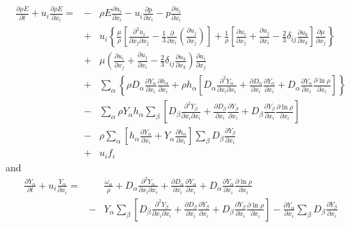 \documentclass[notitlepage]{revtex4-1}
\begin{document}
\begin{eqnarray}
\frac{\partial\rho{E}}{\partial{t}}+u_{i}\frac{\partial\rho{E}}{\partial{x}_{i}}=&-&\rho{E}\frac{\partial{u}_{i}}{\partial{x}_{i}}-u_{i}\frac{\partial{p}}{\partial{x}_{i}}-p\frac{\partial{u}_{i}}{\partial{x}_{i}}\\
&+&u_{i}\left\{\frac{\mu}{\rho}\left[\frac{\partial^{2}u_{i}}{\partial{x}_{j}\partial{x}_{j}}-\frac{1}{3}\frac{\partial}{\partial{x}_{i}}\left(\frac{\partial{u}_{j}}{\partial{x}_{j}}\right)\right]+\frac{1}{\rho}\left[\frac{\partial{u}_{i}}{\partial{x}_{j}}+\frac{\partial{u}_{j}}{\partial{x}_{i}}-\frac{2}{3}\delta_{ij}\frac{\partial{u}_{k}}{\partial{x}_{k}}\right]\frac{\partial\mu}{\partial{x}_{j}}\right\}\\
&+&\mu\left(\frac{\partial{u}_{i}}{\partial{x}_{j}}+\frac{\partial{u}_{j}}{\partial{x}_{i}}-\frac{2}{3}\delta_{ij}\frac{\partial{u}_{k}}{\partial{x}_{k}}\right)\frac{\partial{u}_{i}}{\partial{x}_{j}}\\
&+&\displaystyle\sum_{\alpha}\left\{\rho{D}_{\alpha}\frac{\partial{Y}_{\alpha}}{\partial{x}_{i}}\frac{\partial{h}_{\alpha}}{\partial{x}_{i}}+\rho{h}_{\alpha}\left[D_{\alpha}\frac{\partial^{2}Y_{\alpha}}{\partial{x}_{i}\partial{x}_{i}}
+\frac{\partial{D}_{\alpha}}{\partial{x}_{i}}\frac{\partial{Y}_{\alpha}}{\partial{x}_{i}}+D_{\alpha}\frac{\partial{Y}_{\alpha}}{\partial{x}_{i}}\frac{\partial\ln\rho}{\partial{x}_{i}}\right]\right\}\\
&-&\displaystyle\sum_{\alpha}\rho{Y}_{\alpha}h_{\alpha}\displaystyle\sum_{\beta}\left[D_{\beta}\frac{\partial^{2}{Y}_{\beta}}{\partial{x}_{i}\partial{x}_{i}}+\frac{\partial{D}_{\beta}}{\partial{x}_{i}}\frac{\partial{Y}_{\beta}}{\partial{x}_{i}}+D_{\beta}\frac{\partial{Y}_{\beta}}{\partial{x}_{i}}\frac{\partial\ln\rho}{\partial{x}_{i}}\right]\\
&-&\rho\displaystyle\sum_{\alpha}\left[h_{\alpha}\frac{\partial{Y}_{\alpha}}{\partial{x}_{i}}+Y_{\alpha}\frac{\partial{h}_{\alpha}}{\partial{x}_{i}}\right]\displaystyle\sum_{\beta}D_{\beta}\frac{\partial{Y}_{\beta}}{\partial{x}_{i}}\\
&+&{u}_{i}{f}_{i}
\end{eqnarray}
and
\begin{eqnarray}
\frac{\partial{Y}_{\alpha}}{\partial{t}}+u_{i}\frac{{Y}_{\alpha}}{\partial{x}_{i}}=&&\frac{\dot\omega_{\alpha}}{\rho}
+D_{\alpha}\frac{\partial^{2}Y_{\alpha}}{\partial{x}_{i}\partial{x}_{i}}+\frac{\partial{D}_{\alpha}}{\partial{x}_{i}}\frac{\partial{Y}_{\alpha}}{\partial{x}_{i}}+D_{\alpha}\frac{\partial{Y}_{\alpha}}{\partial{x}_{i}}\frac{\partial\ln\rho}{\partial{x}_{i}}\\
&-&Y_{\alpha}\displaystyle\sum_{\beta}\left[D_{\beta}\frac{\partial^{2}Y_{\beta}}{\partial{x}_{i}\partial{x}_{i}}+\frac{\partial{D}_{\beta}}{\partial{x}_{i}}\frac{\partial{Y}_{\beta}}{\partial{x}_{i}}+D_{\beta}\frac{\partial{Y}_{\beta}}{\partial{x}_{i}}\frac{\partial\ln\rho}{\partial{x}_{i}}\right]-\frac{\partial{Y}_{\alpha}}{\partial{x}_{i}}\displaystyle\sum_{\beta}D_{\beta}\frac{\partial{Y}_{\beta}}{\partial{x}_{i}}
\end{eqnarray}



\end{document}
